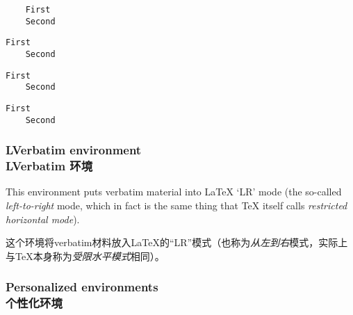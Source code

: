 \documentclass[twoside]{article}
\newcommand\verbatimTxt{抄录}
\begin{document}
\begin{SideBySideExample}
  \begin{BVerbatim}
    First
    Second
  \end{BVerbatim}
  \begin{BVerbatim}[baseline=c]
    First
    Second
  \end{BVerbatim}
\end{SideBySideExample}

\begin{SideBySideExample}
  \begin{BVerbatim}[boxwidth=2cm]
    First
    Second
  \end{BVerbatim}
  \begin{BVerbatim}[boxwidth=2cm,
                    baseline=t]
    First
    Second
  \end{BVerbatim}
\end{SideBySideExample}

\subsubsection{LVerbatim environment\\LVerbatim 环境}


This environment puts verbatim material into \LaTeX{} `LR' mode (the
so-called \emph{left-to-right} mode, which in fact is the same thing that
\TeX{} itself calls \emph{restricted horizontal mode}).

这个环境将verbatim材料放入\LaTeX{}的“LR”模式（也称为\emph{从左到右}模式，实际上与\TeX{}本身称为\emph{受限水平模式}相同）。



\subsubsection{Personalized environments\\个性化环境}
\end{document}
